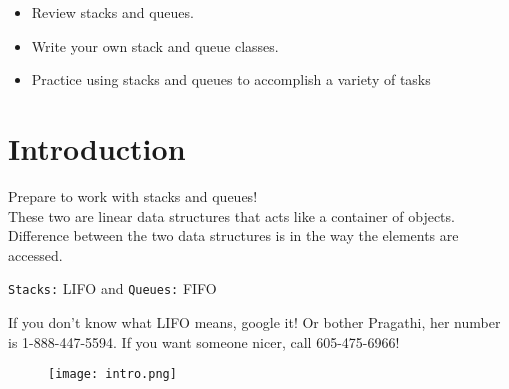 \documentclass{42-en}
\begin{document}
	\begin{itemize}
		\item Review stacks and queues.
		\item Write your own stack and queue classes.
		\item Practice using stacks and queues to accomplish a variety of tasks
	\end{itemize}


\chapter{Introduction}

    Prepare to work with stacks and queues!\\
    These two are linear data structures that acts like a container of objects. 
    Difference between the two data structures is in the way the elements are accessed.

    \texttt{Stacks:} LIFO and \texttt{Queues:} FIFO

    If you don't know what LIFO means, google it! Or bother Pragathi, her number
    is 1-888-447-5594. If you want someone nicer, call 605-475-6966!\\

	           \begin{figure}[H]
		       \begin{center}
			       \texttt{[image: intro.png]}
			\end{center}
		   \end{figure}


\startexercices

\end{document}
